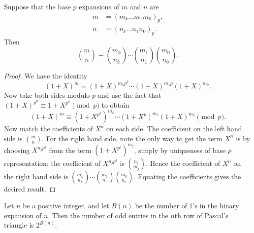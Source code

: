 \begin{thm}
Suppose that the base $p$ expansions of $m$ and $n$ are
\begin{align*}
m&=(m_k\ldots m_1m_0)_p,\\
n&=(n_k\ldots n_1n_0)_p.
\end{align*}
Then
\[
\binom mn\equiv \binom{m_k}{n_k}\cdots \binom{m_1}{n_1}\binom{m_0}{n_0}.
\]
\end{thm}
\begin{proof}
We have the identity
\[
(1+X)^{m}=(1+X)^{m_kp^k}\cdots (1+X)^{m_1p}(1+X)^{m_0}.
\]
Now take both sides modulo $p$ and use the fact that $(1+X)^{p^n}\equiv 1+X^{p^n}\pmod{p}$ to obtain
\[
(1+X)^m\equiv (1+X^{p^k})^{m_k}\cdots (1+X^{p})^{m_1}(1+X)^{m_0}\pmod{p}.
\]
Now match the coefficients of $X^n$ on each side. The coefficient on the left hand side is $\binom mn$. For the right hand side, note the only way to get the term $X^n$ is by choosing $X^{n_jp^j}$ from the term $(1+X^{p^j})^{m_j}$, simply by uniqueness of base $p$ representation; the coefficient of $X^{n_jp^j}$ is $\binom{n_j}{m_j}$. 
Hence the coefficient of $X^n$ on the right hand side is $\binom{m_k}{n_k}\cdots \binom{m_1}{n_1}\binom{m_0}{n_0}$. Equating the coefficients gives the desired result.
\end{proof}
\begin{cor}
Let $n$ be a positive integer, and let $B(n)$ be the number of 1's in the binary expansion of $n$. 
Then the number of odd entries in the $n$th row of Pascal's triangle is $2^{B(n)}$.
\end{cor}
